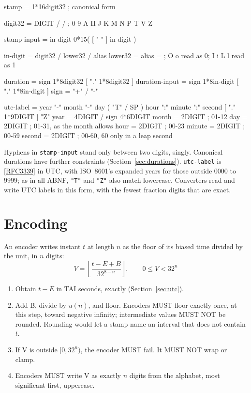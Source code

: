 \documentclass[11pt]{article}
\newcommand{\lit}[1]{\texttt{#1}}
\newcommand{\Sec}[1]{Section~\ref{#1}}
\newcommand{\xref}[1]{[\hyperref[ref:#1]{#1}]}
\begin{document}
\begin{code}
stamp          = 1*16digit32                  ; canonical form

digit32        = DIGIT / %
                 / %
                 ; 0-9 A-H J K M N P-T V-Z

stamp-input    = in-digit 0*15( [ "-" ] in-digit )

in-digit       = digit32 / lower32 / alias
lower32        = %
alias          = %
                 ; O o read as 0; I i L l read as 1

duration       = sign 1*8digit32 [ "." 1*8digit32 ]
duration-input = sign 1*8in-digit [ "." 1*8in-digit ]
sign           = "+" / "-"

utc-label      = year "-" month "-" day ( "T" / SP )
                 hour ":" minute ":" second [ "." 1*9DIGIT ] "Z"
year           = 4DIGIT / sign 4*6DIGIT
month          = 2DIGIT          ; 01-12
day            = 2DIGIT          ; 01-31, as the month allows
hour           = 2DIGIT          ; 00-23
minute         = 2DIGIT          ; 00-59
second         = 2DIGIT          ; 00-60, 60 only in a leap second
\end{code}

Hyphens in \lit{stamp-input} stand only between two digits, singly. Canonical
durations have further constraints (\Sec{sec:durations}). \lit{utc-label} is
\xref{RFC3339} in UTC, with ISO~8601's expanded years for those outside 0000
to 9999; as in all ABNF, \lit{"T"} and \lit{"Z"} also match lowercase.
Converters read and write UTC labels in this form, with the fewest fraction
digits that are exact.

\section{Encoding}\label{sec:encoding}

An encoder writes instant $t$ at length $n$ as the floor of its biased time
divided by the unit, in $n$ digits:
\[
V = \left\lfloor \frac{t - E + B}{32^{8-n}} \right\rfloor, \qquad 0 \le V < 32^n
\]

\begin{enumerate}
\item Obtain $t - E$ in TAI seconds, exactly (\Sec{sec:utc}).
\item Add B, divide by $u(n)$, and floor. Encoders MUST floor exactly once, at
this step, toward negative infinity; intermediate values MUST NOT be rounded.
Rounding would let a stamp name an interval that does not contain $t$.
\item If V is outside $[0, 32^n)$, the encoder MUST fail. It MUST NOT wrap or
clamp.
\item Encoders MUST write V as exactly $n$ digits from the alphabet, most
significant first, uppercase.
\end{enumerate}
\end{document}
